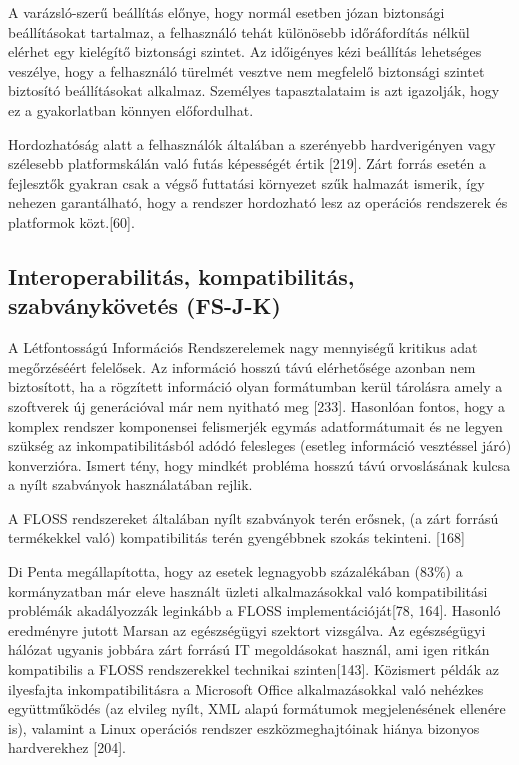 \documentclass[12pt,magyar,a4paper,oneside]{scrreprt}
\begin{document}
A varázsló-szerű beállítás előnye, hogy normál esetben józan biztonsági
beállításokat tartalmaz, a felhasználó tehát különösebb időráfordítás
nélkül elérhet egy kielégítő biztonsági szintet. Az időigényes kézi
beállítás lehetséges veszélye, hogy a felhasználó türelmét vesztve nem
megfelelő biztonsági szintet biztosító beállításokat alkalmaz. Személyes
tapasztalataim is azt igazolják, hogy ez a gyakorlatban könnyen
előfordulhat.

Hordozhatóság alatt a felhasználók általában a szerényebb hardverigényen
vagy szélesebb platformskálán való futás képességét értik {[}219{]}.
Zárt forrás esetén a fejlesztők gyakran csak a végső futtatási környezet
szűk halmazát ismerik, így nehezen garantálható, hogy a rendszer
hordozható lesz az operációs rendszerek és platformok közt.{[}60{]}.

\hypertarget{sec:FS-J-K}{%
\subsection{Interoperabilitás, kompatibilitás, szabványkövetés
(FS-J-K)}\label{sec:FS-J-K}}

A Létfontosságú Információs Rendszerelemek nagy mennyiségű kritikus adat
megőrzéséért felelősek. Az információ hosszú távú elérhetősége azonban
nem biztosított, ha a rögzített információ olyan formátumban kerül
tárolásra amely a szoftverek új generációval már nem nyitható meg
{[}233{]}. Hasonlóan fontos, hogy a komplex rendszer komponensei
felismerjék egymás adatformátumait és ne legyen szükség az
inkompatibilitásból adódó felesleges (esetleg információ vesztéssel
járó) konverzióra. Ismert tény, hogy mindkét probléma hosszú távú
orvoslásának kulcsa a nyílt szabványok használatában rejlik.

A FLOSS rendszereket általában nyílt szabványok terén erősnek, (a zárt
forrású termékekkel való) kompatibilitás terén gyengébbnek szokás
tekinteni. {[}168{]}

Di Penta megállapította, hogy az esetek legnagyobb százalékában (83\%) a
kormányzatban már eleve használt üzleti alkalmazásokkal való
kompatibilitási problémák akadályozzák leginkább a FLOSS
implementációját{[}78, 164{]}. Hasonló eredményre jutott Marsan az
egészségügyi szektort vizsgálva. Az egészségügyi hálózat ugyanis jobbára
zárt forrású IT megoldásokat használ, ami igen ritkán kompatibilis a
FLOSS rendszerekkel technikai szinten{[}143{]}. Közismert példák az
ilyesfajta inkompatibilitásra a Microsoft Office alkalmazásokkal való
nehézkes együttműködés (az elvileg nyílt, XML alapú formátumok
megjelenésének ellenére is), valamint a Linux operációs rendszer
eszközmeghajtóinak hiánya bizonyos hardverekhez {[}204{]}.
\end{document}
